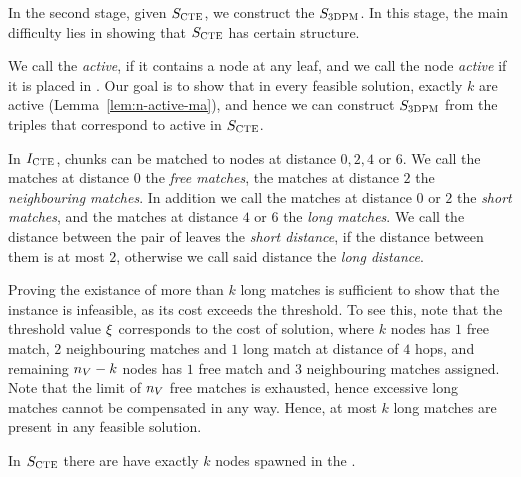 In the second stage, given $S_{\mathrm{\textsc{CTE}}}$, we construct the $S_{\mathrm{\textsc{3DPM}}}$.
In this stage, the main difficulty lies in showing that $S_{\mathrm{\textsc{CTE}}}$ has certain structure.

We call the {\TripleGadget} \textit{active}, if it contains a node at any leaf, and we call the node \textit{active} if it is placed in {\TripleGadget}.
Our goal is to show that in every feasible solution, exactly $k$ \TripleGadgets{} are active (Lemma~\ref{lem:n-active-ma}), and hence we can construct $S_{\mathrm{\textsc{3DPM}}}$ from the triples that correspond to active \TripleGadgets{} in $S_{\mathrm{\textsc{CTE}}}$.

In $I_{\mathrm{\textsc{CTE}}}$, chunks can be matched to nodes at distance $0, 2, 4$ or $6$.
  We call the matches at distance $0$ the \emph{free matches}, the matches at distance $2$ the \emph{neighbouring matches}.
  In addition we call the matches at distance $0$ or $2$ the \emph{short matches}, and the matches at distance $4$ or $6$ the \emph{long matches}.
  We call the distance between the pair of leaves the \emph{short distance}, if the distance between them is at most $2$, otherwise we call said distance the \emph{long distance}.

Proving the existance of more than $k$ long matches is sufficient to show that the instance is infeasible, as its cost exceeds the threshold.
To see this, note that the threshold value $\xi$ corresponds to the cost of solution, where $k$ nodes has $1$ free match, $2$ neighbouring matches and $1$ long match at distance of $4$ hops, and remaining $n_V-k$ nodes has $1$ free match and $3$ neighbouring matches assigned.
Note that the limit of $n_V$ free matches is exhausted, hence excessive long matches cannot be compensated in any way.
Hence, at most $k$ long matches are present in any feasible solution.


\begin{lemma}
  In $S_{\mathrm{\textsc{CTE}}}$ there are have exactly $k$ nodes spawned in the \MatchSubtree.
  \label{lem:n-matchsubtree-ma}
\end{lemma}

